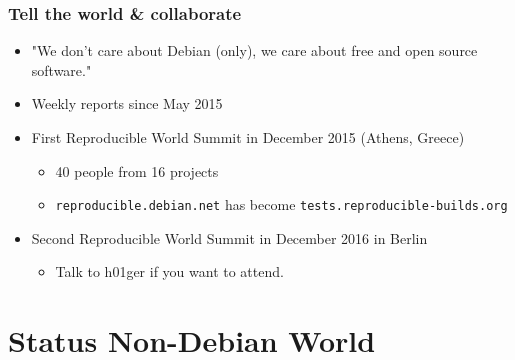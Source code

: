 \documentclass[14pt,aspectratio=169]{beamer}
\newif\ifplacelogo
\begin{document}
\begin{frame}
 \frametitle{Tell the world \& collaborate}

 \begin{itemize}
  \item "We don't care about Debian (only), we care about free and open
   source software."
  \item<2-4> Weekly reports since May 2015
  \item<3-4> First Reproducible World Summit in December 2015 (Athens, Greece)
   \begin{itemize}
    \item<3-4> 40 people from 16 projects
    \item<3-4> \texttt{reproducible.debian.net} has become \texttt{tests.reproducible-builds.org}
   \end{itemize}
    \item<4> Second Reproducible World Summit in December 2016 in Berlin
   \begin{itemize}
    \item<4> Talk to h01ger if you want to attend.
   \end{itemize}
 \end{itemize}
\end{frame}



\section{Status Non-Debian World}

\placelogofalse
\end{document}
